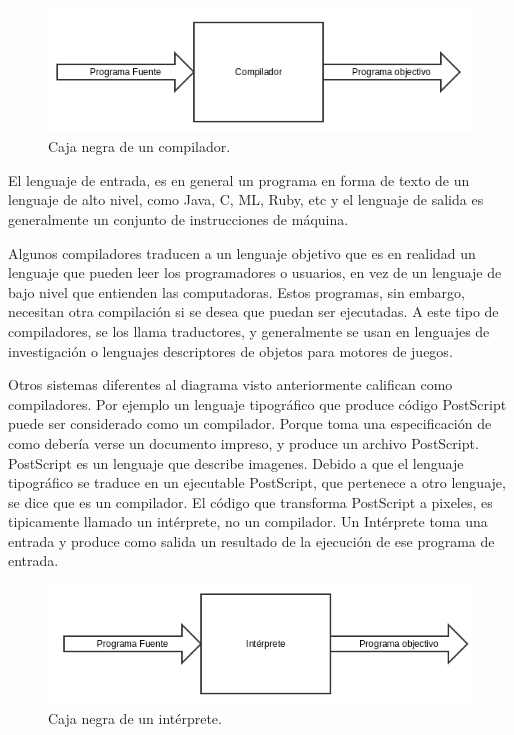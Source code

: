 \documentclass[fleqn]{tcdl}
\begin{document}
\begin{figure}[h]
\captionsetup{type=figure}
\includegraphics[width=\textwidth]{compilador_basico.png}
\caption{\label{fig:comp_basic}Caja negra de un compilador.}
\end{figure}


El lenguaje de entrada, es en general un programa en forma de texto de un lenguaje de alto nivel, como Java, C, ML, Ruby, etc y el lenguaje de salida es generalmente un conjunto de instrucciones de máquina.

Algunos compiladores traducen a un lenguaje objetivo que es en realidad un lenguaje que pueden leer los programadores o usuarios, en vez de un lenguaje de bajo nivel que entienden las computadoras. Estos programas, sin embargo, necesitan otra compilación si se desea que puedan ser ejecutadas. A este tipo de compiladores, se los llama traductores, y generalmente se usan en lenguajes de investigación o lenguajes descriptores de objetos para motores de juegos.


Otros sistemas diferentes al diagrama visto anteriormente califican como compiladores. Por ejemplo un lenguaje tipográfico que produce código PostScript puede ser considerado como un compilador. Porque toma una especificación de como debería verse un documento impreso, y produce un  archivo PostScript. PostScript es un lenguaje que describe imagenes. Debido a que el lenguaje tipográfico se traduce en un ejecutable PostScript, que pertenece a otro lenguaje, se dice que es un compilador. El código que transforma PostScript a pixeles, es tipicamente llamado un intérprete, no un compilador. Un Intérprete toma una entrada y produce como salida un resultado de la ejecución de ese programa de entrada.

\begin{figure}[h]
\captionsetup{type=figure}
\includegraphics[width=\textwidth]{interprete_basico.png}
\caption{\label{fig:inter}Caja negra de un intérprete.}
\end{figure}
\end{document}
